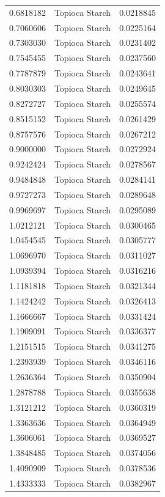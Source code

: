 \documentclass[
  12pt,
]{article}
\begin{document}
{\begin{longtable}[]{@{}rlr@{}}
0.6818182 & Topioca Starch & 0.0218845 \\
0.7060606 & Topioca Starch & 0.0225164 \\
0.7303030 & Topioca Starch & 0.0231402 \\
0.7545455 & Topioca Starch & 0.0237560 \\
0.7787879 & Topioca Starch & 0.0243641 \\
0.8030303 & Topioca Starch & 0.0249645 \\
0.8272727 & Topioca Starch & 0.0255574 \\
0.8515152 & Topioca Starch & 0.0261429 \\
0.8757576 & Topioca Starch & 0.0267212 \\
0.9000000 & Topioca Starch & 0.0272924 \\
0.9242424 & Topioca Starch & 0.0278567 \\
0.9484848 & Topioca Starch & 0.0284141 \\
0.9727273 & Topioca Starch & 0.0289648 \\
0.9969697 & Topioca Starch & 0.0295089 \\
1.0212121 & Topioca Starch & 0.0300465 \\
1.0454545 & Topioca Starch & 0.0305777 \\
1.0696970 & Topioca Starch & 0.0311027 \\
1.0939394 & Topioca Starch & 0.0316216 \\
1.1181818 & Topioca Starch & 0.0321344 \\
1.1424242 & Topioca Starch & 0.0326413 \\
1.1666667 & Topioca Starch & 0.0331424 \\
1.1909091 & Topioca Starch & 0.0336377 \\
1.2151515 & Topioca Starch & 0.0341275 \\
1.2393939 & Topioca Starch & 0.0346116 \\
1.2636364 & Topioca Starch & 0.0350904 \\
1.2878788 & Topioca Starch & 0.0355638 \\
1.3121212 & Topioca Starch & 0.0360319 \\
1.3363636 & Topioca Starch & 0.0364949 \\
1.3606061 & Topioca Starch & 0.0369527 \\
1.3848485 & Topioca Starch & 0.0374056 \\
1.4090909 & Topioca Starch & 0.0378536 \\
1.4333333 & Topioca Starch & 0.0382967 \\

\end{longtable}}
\end{document}
